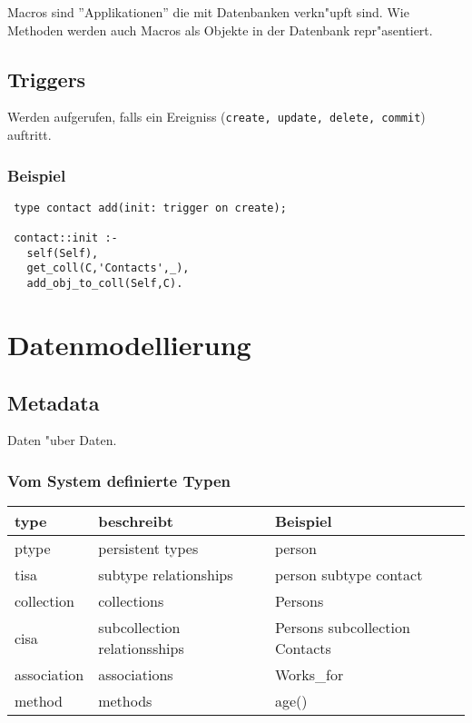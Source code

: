 \documentclass[german, 10pt, a4paper, twocolumn]{scrartcl}
\theoremstyle{definition}
\theoremstyle{remark}
\theoremstyle{example}
\begin{document}
Macros sind ''Applikationen'' die mit Datenbanken verkn"upft sind. Wie Methoden werden auch Macros als Objekte in der Datenbank repr"asentiert.

\subsection{Triggers}

Werden aufgerufen, falls ein Ereigniss (\texttt{create, update, delete, commit}) auftritt.

\subsubsection{Beispiel}

\begin{verbatim}
 type contact add(init: trigger on create);

 contact::init :-
   self(Self),
   get_coll(C,'Contacts',_),
   add_obj_to_coll(Self,C).
\end{verbatim}



\section{Datenmodellierung}

\subsection{Metadata}

Daten "uber Daten.

\subsubsection{Vom System definierte Typen}

\tiny
\begin{tabular}{lll}
	type &		beschreibt &			Beispiel\\ \hline
	ptype &		persistent types &		person\\
	tisa &		subtype relationships &		person subtype contact\\
	collection &	collections &			Persons\\
	cisa &		subcollection relationsships &	Persons subcollection Contacts\\
	association &	associations &			Works\_for\\
	method &	methods &			age()
\end{tabular}
\normalsize
\end{document}

